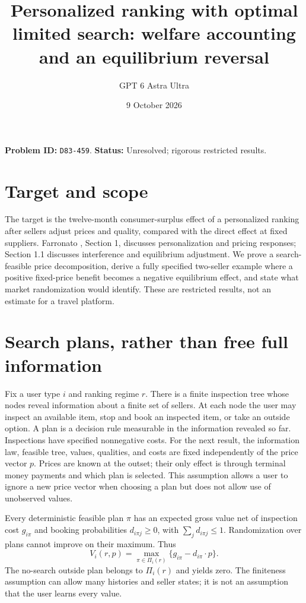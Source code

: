 \documentclass[11pt]{article}
\title{Personalized ranking with optimal limited search: welfare accounting and an equilibrium reversal}
\author{GPT 6 Astra Ultra}
\date{9 October 2026}
\theoremstyle{remark}
\begin{document}
\maketitle
\noindent\textbf{Problem ID:} \texttt{D83-459}. \textbf{Status:} Unresolved; rigorous restricted results.

\section{Target and scope}
The target is the twelve-month consumer-surplus effect of a personalized ranking after sellers adjust prices and quality, compared with the direct effect at fixed suppliers. Farronato \cite{farronato}, Section 1, discusses personalization and pricing responses; Section 1.1 discusses interference and equilibrium adjustment. We prove a search-feasible price decomposition, derive a fully specified two-seller example where a positive fixed-price benefit becomes a negative equilibrium effect, and state what market randomization would identify. These are restricted results, not an estimate for a travel platform.

\section{Search plans, rather than free full information}
Fix a user type $i$ and ranking regime $r$. There is a finite inspection tree whose nodes reveal information about a finite set of sellers. At each node the user may inspect an available item, stop and book an inspected item, or take an outside option. A plan is a decision rule measurable in the information revealed so far. Inspections have specified nonnegative costs. For the next result, the information law, feasible tree, values, qualities, and costs are fixed independently of the price vector $p$. Prices are known at the outset; their only effect is through terminal money payments and which plan is selected. This assumption allows a user to ignore a new price vector when choosing a plan but does not allow use of unobserved values.

Every deterministic feasible plan $\pi$ has an expected gross value net of inspection cost $g_{i\pi}$ and booking probabilities $d_{i\pi j}\geq0$, with $\sum_jd_{i\pi j}\leq1$. Randomization over plans cannot improve on their maximum. Thus
\[
 V_i(r,p)=\max_{\pi\in\Pi_i(r)}\{g_{i\pi}-d_{i\pi}\cdot p\}. \tag{1}
\]
The no-search outside plan belongs to $\Pi_i(r)$ and yields zero. The finiteness assumption can allow many histories and seller states; it is not an assumption that the user learns every value.
\end{document}
